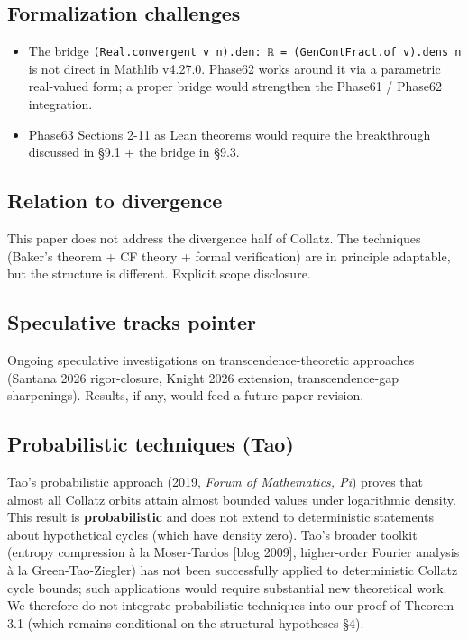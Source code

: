 \documentclass[
  11pt]{amsart}
\providecommand{\tightlist}{%
  \setlength{\itemsep}{0pt}\setlength{\parskip}{0pt}}
\theoremstyle{plain}
\theoremstyle{definition}
\theoremstyle{remark}
\begin{document}
\subsection{Formalization challenges}\label{formalization-challenges}

\begin{itemize}
\tightlist
\item
  The bridge
  \texttt{(Real.convergent\ v\ n).den:\ ℝ\ =\ (GenContFract.of\ v).dens\ n}
  is not direct in Mathlib v4.27.0. Phase62 works around it via a
  parametric real-valued form; a proper bridge would strengthen the
  Phase61 / Phase62 integration.
\item
  Phase63 Sections 2-11 as Lean theorems would require the breakthrough
  discussed in §9.1 + the bridge in §9.3.
\end{itemize}

\subsection{Relation to divergence}\label{relation-to-divergence}

This paper does not address the divergence half of Collatz. The
techniques (Baker's theorem + CF theory + formal verification) are in
principle adaptable, but the structure is different. Explicit scope
disclosure.

\subsection{Speculative tracks
pointer}\label{speculative-tracks-pointer}

Ongoing speculative investigations on transcendence-theoretic approaches
(Santana 2026 rigor-closure, Knight 2026 extension, transcendence-gap
sharpenings). Results, if any, would feed a future paper revision.

\subsection{Probabilistic techniques
(Tao)}\label{probabilistic-techniques-tao}

Tao's probabilistic approach (2019, \emph{Forum of Mathematics, Pi})
proves that almost all Collatz orbits attain almost bounded values under
logarithmic density. This result is \textbf{probabilistic} and does not
extend to deterministic statements about hypothetical cycles (which have
density zero). Tao's broader toolkit (entropy compression à la
Moser-Tardos {[}blog 2009{]}, higher-order Fourier analysis à la
Green-Tao-Ziegler) has not been successfully applied to deterministic
Collatz cycle bounds; such applications would require substantial new
theoretical work. We therefore do not integrate probabilistic techniques
into our proof of Theorem 3.1 (which remains conditional on the
structural hypotheses §4).
\end{document}
